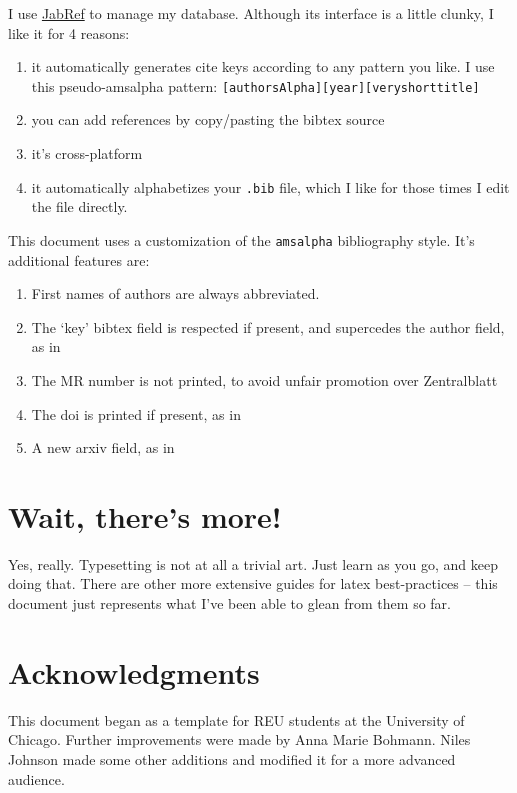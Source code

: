 \documentclass[11pt,oneside,draft]{amsart}
\begin{document}
I use \href{http://jabref.sourceforge.net/}{JabRef} to manage my
database.  Although its interface is a little clunky, I like it for 4 reasons:
\begin{enumerate}
\item it automatically generates cite keys according to any pattern
  you like.  I use this pseudo-amsalpha pattern: \texttt{[authorsAlpha][year][veryshorttitle]}
\item you can add references by copy/pasting the bibtex source
\item it's cross-platform
\item it automatically alphabetizes your \texttt{.bib} file, which I
  like for those times I edit the file directly.
\end{enumerate}

This document uses a customization of the \texttt{amsalpha}
bibliography style.  It's additional features are:
\begin{enumerate}
\item First names of authors are always abbreviated.
\item The `key' bibtex field is respected if present, and supercedes
  the author field, as in \cite{ATC,sage}
\item The MR number is not printed, to avoid unfair promotion over
  Zentralblatt
\item The doi is printed if present, as in \cite{JN2010Complex}
\item A new arxiv field, as in \cite{GO2012Infinite,JN2010Complex}
\end{enumerate}
 

\section{Wait, there's more!}

Yes, really.  Typesetting is not at all a trivial art.  Just learn as
you go, and keep doing that.  There are other more extensive guides
for latex best-practices -- this document just represents what I've
been able to glean from them so far.

\section*{Acknowledgments}  

This document began as a template for REU students at the University
of Chicago.  Further improvements were made by Anna Marie Bohmann.
Niles Johnson made some other additions and modified it for a more
advanced audience.


%
\end{document}
